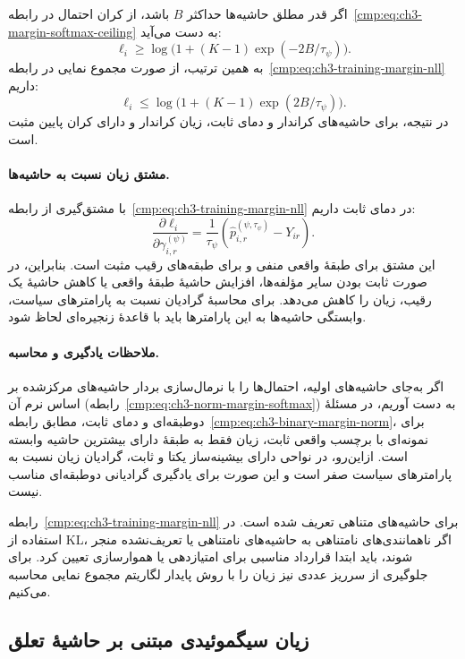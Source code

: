 اگر قدر مطلق حاشیه‌ها حداکثر $B$ باشد، از کران
احتمال در رابطه~\eqref{cmp:eq:ch3-margin-softmax-ceiling}
به دست می‌آید:
\[
\ell_i\ge\log\bigl(1+(K-1)\exp(-2B/\tau_\psi)\bigr).
\]
به همین ترتیب، از صورت مجموع نمایی در
رابطه~\eqref{cmp:eq:ch3-training-margin-nll} داریم:
\[
\ell_i\le\log\bigl(1+(K-1)\exp(2B/\tau_\psi)\bigr).
\]
در نتیجه، برای حاشیه‌های کراندار و دمای ثابت،
زیان کراندار و دارای کران پایین مثبت است.

\paragraph{مشتق زیان نسبت به حاشیه‌ها.}
با مشتق‌گیری از رابطه~\eqref{cmp:eq:ch3-training-margin-nll}
در دمای ثابت داریم:
\begin{equation}\label{cmp:eq:ch3-training-margin-nll-derivative}
\boxed{
\frac{\partial\ell_i}{\partial\gamma_{i,r}^{(\psi)}}
=\frac{1}{\tau_\psi}
\left(\widehat p_{i,r}^{(\psi,\tau_\psi)}-Y_{ir}\right).
}
\end{equation}
این مشتق برای طبقهٔ واقعی منفی و برای طبقه‌های
رقیب مثبت است. بنابراین، در صورت ثابت بودن
سایر مؤلفه‌ها، افزایش حاشیهٔ طبقهٔ واقعی یا کاهش
حاشیهٔ یک رقیب، زیان را کاهش می‌دهد.
برای محاسبهٔ گرادیان نسبت به پارامترهای سیاست،
وابستگی حاشیه‌ها به این پارامترها باید با قاعدهٔ
زنجیره‌ای لحاظ شود.

\paragraph{ملاحظات یادگیری و محاسبه.}
اگر به‌جای حاشیه‌های اولیه، احتمال‌ها را با
نرمال‌سازی بردار حاشیه‌های مرکزشده بر اساس نرم آن
(رابطه~\eqref{cmp:eq:ch3-norm-margin-softmax})
به دست آوریم، در مسئلهٔ دوطبقه‌ای و دمای ثابت،
مطابق رابطه~\eqref{cmp:eq:ch3-binary-margin-norm}،
برای نمونه‌ای با برچسب واقعی ثابت، زیان فقط به
طبقهٔ دارای بیشترین حاشیه وابسته است.
ازاین‌رو، در نواحی دارای بیشینه‌ساز یکتا و ثابت،
گرادیان زیان نسبت به پارامترهای سیاست صفر است
و این صورت برای یادگیری گرادیانی دوطبقه‌ای
مناسب نیست.

رابطه~\eqref{cmp:eq:ch3-training-margin-nll}
برای حاشیه‌های متناهی تعریف شده است. در استفاده
از KL، اگر ناهمانندی‌های نامتناهی به حاشیه‌های
نامتناهی یا تعریف‌نشده منجر شوند، باید ابتدا
قرارداد مناسبی برای امتیازدهی یا هموارسازی تعیین کرد.
برای جلوگیری از سرریز عددی نیز زیان را با روش
پایدار لگاریتم مجموع نمایی محاسبه می‌کنیم.

\subsection{زیان سیگموئیدی مبتنی بر حاشیهٔ تعلق}
\label{cmp:subsec:ch3-training-sigmoid-loss}

